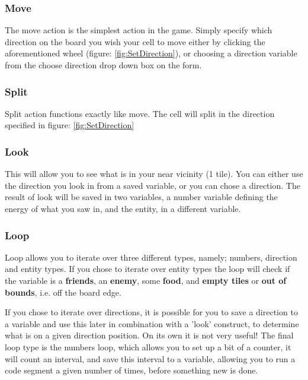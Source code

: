 \documentclass[12pt]{article}
\begin{document}
\subsubsection{Move}

The move action is the simplest action in the game. Simply specify which direction on the board you wish your cell to move either by clicking the aforementioned wheel (figure: \ref{fig:SetDirection}), or choosing a direction variable from the choose direction drop down box on the form.

\subsubsection{Split}

Split action functions exactly like move. The cell will split in the direction specified in figure: \ref{fig:SetDirection}

\subsubsection{Look}

This will allow you to see what is in your near vicinity (1 tile). You can either use the direction you look in from a saved variable, or you can chose a direction. The result of look will be saved in two variables, a number variable defining the energy of what you saw in, and the entity, in a different variable.

\subsubsection{Loop}

Loop allows you to iterate over three different types, namely; numbers, direction and entity types. If you chose to iterate over entity types the loop will check if the variable is a \textbf{friends}, an \textbf{enemy}, some \textbf{food}, and \textbf{empty tiles} or \textbf{out of bounds}, i.e. off the board edge.


If you chose to iterate over directions, it is possible for you to save a direction to a variable and use this later in combination with a 'look' construct, to determine what is on a given direction position. On its own it is not very useful! The final loop type is the numbers loop, which allows you to set up a bit of a counter, it will count an interval, and save this interval to a variable, allowing you to run a code segment a given number of times, before something new is done.
\end{document}
